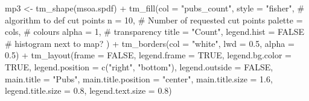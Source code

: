 \documentclass[
  letterpaper,
  DIV=11,
  numbers=noendperiod]{scrreprt}
\newenvironment{Shaded}{\begin{snugshade}}{\end{snugshade}}
\newcommand{\AttributeTok}[1]{\textcolor[rgb]{0.40,0.45,0.13}{#1}}
\newcommand{\CommentTok}[1]{\textcolor[rgb]{0.37,0.37,0.37}{#1}}
\newcommand{\ConstantTok}[1]{\textcolor[rgb]{0.56,0.35,0.01}{#1}}
\newcommand{\DecValTok}[1]{\textcolor[rgb]{0.68,0.00,0.00}{#1}}
\newcommand{\FloatTok}[1]{\textcolor[rgb]{0.68,0.00,0.00}{#1}}
\newcommand{\FunctionTok}[1]{\textcolor[rgb]{0.28,0.35,0.67}{#1}}
\newcommand{\NormalTok}[1]{\textcolor[rgb]{0.00,0.23,0.31}{#1}}
\newcommand{\OtherTok}[1]{\textcolor[rgb]{0.00,0.23,0.31}{#1}}
\newcommand{\SpecialCharTok}[1]{\textcolor[rgb]{0.37,0.37,0.37}{#1}}
\newcommand{\StringTok}[1]{\textcolor[rgb]{0.13,0.47,0.30}{#1}}
\begin{document}
\begin{Shaded}
\begin{Highlighting}[]
\NormalTok{mp3 }\OtherTok{\textless{}{-}}  \FunctionTok{tm\_shape}\NormalTok{(msoa.spdf) }\SpecialCharTok{+} 
  \FunctionTok{tm\_fill}\NormalTok{(}\AttributeTok{col =} \StringTok{"pubs\_count"}\NormalTok{, }
          \AttributeTok{style =} \StringTok{"fisher"}\NormalTok{, }\CommentTok{\# algorithm to def cut points}
          \AttributeTok{n =} \DecValTok{10}\NormalTok{, }\CommentTok{\# Number of requested cut points}
          \AttributeTok{palette =}\NormalTok{ cols, }\CommentTok{\# colours}
          \AttributeTok{alpha =} \DecValTok{1}\NormalTok{, }\CommentTok{\# transparency }
          \AttributeTok{title =} \StringTok{"Count"}\NormalTok{, }
          \AttributeTok{legend.hist =} \ConstantTok{FALSE} \CommentTok{\# histogram next to map?}
\NormalTok{          ) }\SpecialCharTok{+}
  \FunctionTok{tm\_borders}\NormalTok{(}\AttributeTok{col =} \StringTok{"white"}\NormalTok{, }\AttributeTok{lwd =} \FloatTok{0.5}\NormalTok{, }\AttributeTok{alpha =} \FloatTok{0.5}\NormalTok{) }\SpecialCharTok{+}
  \FunctionTok{tm\_layout}\NormalTok{(}\AttributeTok{frame =} \ConstantTok{FALSE}\NormalTok{,}
            \AttributeTok{legend.frame =} \ConstantTok{TRUE}\NormalTok{, }\AttributeTok{legend.bg.color =} \ConstantTok{TRUE}\NormalTok{,}
            \AttributeTok{legend.position =} \FunctionTok{c}\NormalTok{(}\StringTok{"right"}\NormalTok{, }\StringTok{"bottom"}\NormalTok{),}
            \AttributeTok{legend.outside =} \ConstantTok{FALSE}\NormalTok{,}
            \AttributeTok{main.title =} \StringTok{"Pubs"}\NormalTok{, }
            \AttributeTok{main.title.position =} \StringTok{"center"}\NormalTok{,}
            \AttributeTok{main.title.size =} \FloatTok{1.6}\NormalTok{,}
            \AttributeTok{legend.title.size =} \FloatTok{0.8}\NormalTok{,}
            \AttributeTok{legend.text.size =} \FloatTok{0.8}\NormalTok{)}



\end{Highlighting}
\end{Shaded}
\end{document}
